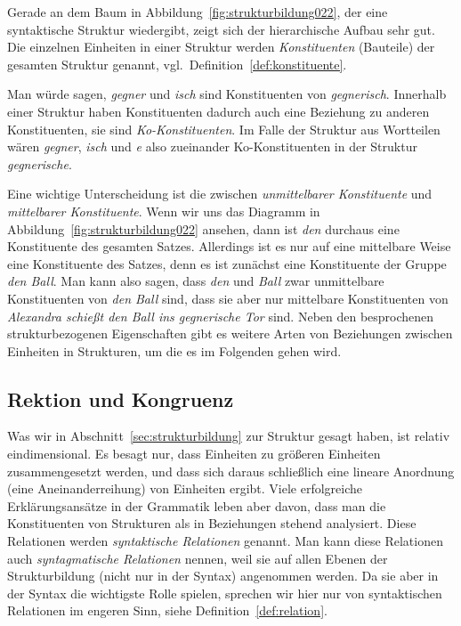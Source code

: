 Gerade an dem Baum in Abbildung~\ref{fig:strukturbildung022}, der eine syntaktische Struktur wiedergibt, zeigt sich der hierarchische Aufbau sehr gut.
Die einzelnen Einheiten in einer Struktur werden \textit{Konstituenten} (Bauteile) der gesamten Struktur genannt, vgl.\ Definition~\ref{def:konstituente}.


Man würde sagen, \textit{gegner} und \textit{isch} sind Konstituenten von \textit{gegnerisch}.
Innerhalb einer Struktur haben Konstituenten dadurch auch eine Beziehung zu anderen Konstituenten, sie sind \textit{Ko-Konstituenten}.
Im Falle der Struktur aus Wortteilen wären \textit{gegner}, \textit{isch} und \textit{e} also zueinander Ko-Konstituenten in der Struktur \textit{gegnerische}.


Eine wichtige Unterscheidung ist die zwischen \textit{unmittelbarer Konstituente} und \textit{mittelbarer Konstituente}.
Wenn wir uns das Diagramm in Abbildung~\ref{fig:strukturbildung022} ansehen, dann ist \textit{den} durchaus eine Konstituente des gesamten Satzes.
Allerdings ist es nur auf eine mittelbare Weise eine Konstituente des Satzes, denn es ist zunächst eine Konstituente der Gruppe \textit{den Ball}.
Man kann also sagen, dass \textit{den} und \textit{Ball} zwar unmittelbare Konstituenten von \textit{den Ball} sind, dass sie aber nur mittelbare Konstituenten von \textit{Alexandra schießt den Ball ins gegnerische Tor} sind.
Neben den besprochenen strukturbezogenen Eigenschaften gibt es weitere Arten von Beziehungen zwischen Einheiten in Strukturen, um die es im Folgenden gehen wird.

\subsection{Rektion und Kongruenz}
\label{sec:rektionundkongruenz}

Was wir in Abschnitt~\ref{sec:strukturbildung} zur Struktur gesagt haben, ist relativ eindimensional.
Es besagt nur, dass Einheiten zu größeren Einheiten zusammengesetzt werden, und dass sich daraus schließlich eine lineare Anordnung (eine Aneinanderreihung) von Einheiten ergibt.
Viele erfolgreiche Erklärungsansätze in der Grammatik leben aber davon, dass man die Konstituenten von Strukturen als in Beziehungen stehend analysiert.
Diese Relationen werden \textit{syntaktische Relationen} genannt.
Man kann diese Relationen auch \textit{syntagmatische Relationen} nennen, weil sie auf allen Ebenen der Strukturbildung (nicht nur in der Syntax) angenommen werden.
Da sie aber in der Syntax die wichtigste Rolle spielen, sprechen wir hier nur von syntaktischen Relationen im engeren Sinn, siehe Definition~\ref{def:relation}.

